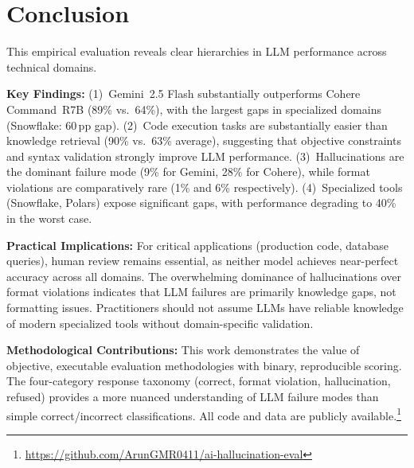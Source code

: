 \documentclass[conference]{IEEEtran}
\begin{document}
\section{Conclusion}

This empirical evaluation reveals clear hierarchies in LLM performance across technical domains.

\textbf{Key Findings:}
(1)~Gemini~2.5 Flash substantially outperforms Cohere Command~R7B (89\% vs.\ 64\%), with the largest gaps in specialized domains (Snowflake: 60\,pp gap).
(2)~Code execution tasks are substantially easier than knowledge retrieval (90\% vs.\ 63\% average), suggesting that objective constraints and syntax validation strongly improve LLM performance.
(3)~Hallucinations are the dominant failure mode (9\% for Gemini, 28\% for Cohere), while format violations are comparatively rare (1\% and 6\% respectively).
(4)~Specialized tools (Snowflake, Polars) expose significant gaps, with performance degrading to 40\% in the worst case.

\textbf{Practical Implications:}
For critical applications (production code, database queries), human review remains essential, as neither model achieves near-perfect accuracy across all domains. The overwhelming dominance of hallucinations over format violations indicates that LLM failures are primarily knowledge gaps, not formatting issues. Practitioners should not assume LLMs have reliable knowledge of modern specialized tools without domain-specific validation.

\textbf{Methodological Contributions:}
This work demonstrates the value of objective, executable evaluation methodologies with binary, reproducible scoring. The four-category response taxonomy (correct, format violation, hallucination, refused) provides a more nuanced understanding of LLM failure modes than simple correct/incorrect classifications. All code and data are publicly available.\footnote{\url{https://github.com/ArunGMR0411/ai-hallucination-eval}}

\balance


\end{document}

